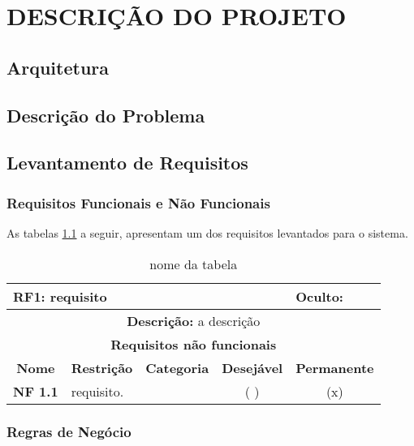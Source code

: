 \chapter{DESCRIÇÃO DO PROJETO} \label{capitulo}

\section{Arquitetura}

\section{Descrição do Problema}

\section{Levantamento de Requisitos}

\subsection{Requisitos Funcionais e Não Funcionais}

As tabelas \ref{rf1} a seguir, apresentam um dos requisitos levantados para o sistema.

\begin{table}[htbp!]
\caption{nome da tabela}
\begin{center}
  \begin{tabularx}{\textwidth}{|c|X|c|c|c|}
      \hline
      \multicolumn{4}{|l|}{\textbf{RF1: requisito}} & \multicolumn{1}{l|}{\textbf{Oculto:}}\\
      \hline
      \multicolumn{5}{|p{14cm}|}{\textbf{Descrição:} a descrição}\\
      \hline
      \multicolumn{5}{|c|}{\textbf{Requisitos não funcionais}}\\
      \hline
      \textbf{Nome} & \multicolumn{1}{c|}{\textbf{Restrição}} & \textbf{Categoria} & \textbf{Desejável} & \textbf{Permanente}\\
      \hline
      \textbf{NF 1.1} & requisito. &           & ( ) & (x)\\
      \hline
    \end{tabularx}
  \end{center}
  \label{rf1}
\end{table}


\subsection{Regras de Negócio}

